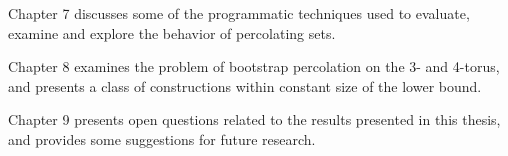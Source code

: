 Chapter 7 discusses some of the programmatic techniques used to evaluate, examine and explore the behavior of percolating sets. 

Chapter 8 examines the problem of bootstrap percolation on the 3- and 4-torus, and presents a class of constructions within constant size of the lower bound. 

Chapter 9 presents open questions related to the results presented in this thesis, and provides some suggestions for future research.





